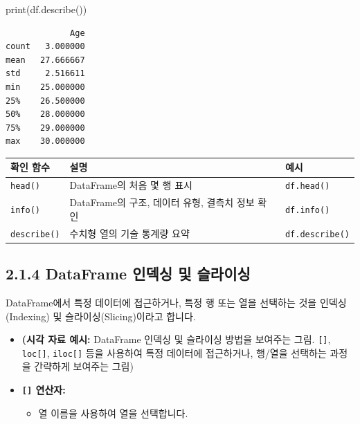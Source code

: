 \documentclass[
  letterpaper,
]{book}
\newenvironment{Shaded}{\begin{snugshade}}{\end{snugshade}}
\newcommand{\BuiltInTok}[1]{\textcolor[rgb]{0.00,0.23,0.31}{#1}}
\newcommand{\NormalTok}[1]{\textcolor[rgb]{0.00,0.23,0.31}{#1}}
\providecommand{\tightlist}{%
  \setlength{\itemsep}{0pt}\setlength{\parskip}{0pt}}
\begin{document}
\begin{Shaded}
\begin{Highlighting}[]
    \BuiltInTok{print}\NormalTok{(df.describe())}
\end{Highlighting}
\end{Shaded}

\begin{verbatim}
             Age
count   3.000000
mean   27.666667
std     2.516611
min    25.000000
25%    26.500000
50%    28.000000
75%    29.000000
max    30.000000
\end{verbatim}

\begin{longtable}[]{@{}
  >{\centering\arraybackslash}p{}
  >{\centering\arraybackslash}p{}
  >{\centering\arraybackslash}p{}@{}}
\toprule\noalign{}
\begin{minipage}[b]{\linewidth}\centering
확인 함수
\end{minipage} & \begin{minipage}[b]{\linewidth}\centering
설명
\end{minipage} & \begin{minipage}[b]{\linewidth}\centering
예시
\end{minipage} \\
\midrule\noalign{}
\endhead
\bottomrule\noalign{}
\endlastfoot
\texttt{head()} & DataFrame의 처음 몇 행 표시 & \texttt{df.head()} \\
\texttt{info()} & DataFrame의 구조, 데이터 유형, 결측치 정보 확인 &
\texttt{df.info()} \\
\texttt{describe()} & 수치형 열의 기술 통계량 요약 &
\texttt{df.describe()} \\
\end{longtable}

\subsection{2.1.4 DataFrame 인덱싱 및
슬라이싱}\label{dataframe-uxc778uxb371uxc2f1-uxbc0f-uxc2acuxb77cuxc774uxc2f1}

DataFrame에서 특정 데이터에 접근하거나, 특정 행 또는 열을 선택하는 것을
인덱싱(Indexing) 및 슬라이싱(Slicing)이라고 합니다.

\begin{itemize}
\item
  \textbf{(시각 자료 예시:} DataFrame 인덱싱 및 슬라이싱 방법을 보여주는
  그림. \texttt{{[}{]}}, \texttt{loc{[}{]}}, \texttt{iloc{[}{]}} 등을
  사용하여 특정 데이터에 접근하거나, 행/열을 선택하는 과정을 간략하게
  보여주는 그림)
\item
  \textbf{\texttt{{[}{]}} 연산자:}

  \begin{itemize}
  \tightlist
  \item
    열 이름을 사용하여 열을 선택합니다.
  \end{itemize}
\end{itemize}
\end{document}

